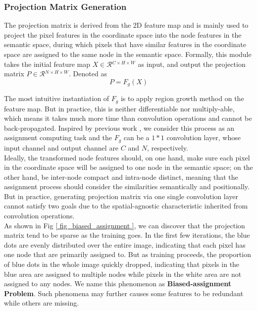 ﻿\documentclass[journal]{IEEEtran}
\begin{document}
\subsubsection{Projection Matrix Generation}\label{sec_generate_proj_matrix}
   
    The projection matrix is derived from the 2D feature map and is mainly used to project the pixel features in the coordinate space into the node features in the semantic space, during which pixels that have similar features in the coordinate space are assigned to the same node in the semantic space. Formally, this module takes the initial feature map ${X}\in\mathcal{R}{^{C\times H\times W}}$ as input, and output the projection matrix ${P}\in\mathcal{R}{^{N\times H \times W}}$. Denoted as 
    \begin{equation}\label{eq_gen_proj}
    P = F_g(X)
    \end{equation}

   
    The most intuitive instantiation of $F_g$ is to apply region growth method on the feature map. But in practice, this is neither differentiable nor multiply-able, which means it takes much more time than convolution operations and cannot be back-propagated. Inspired by previous work \cite{chen2019glore}, we consider this process as an assignment computing task and the $F_g$ can be a $1*1$ convolution layer, whose input channel and output channel are $C$ and $N$, respectively. \\   

 
    Ideally, the transformed node features should, on one hand, make sure each pixel in the coordinate space will be assigned to one node in the semantic space; on the other hand, be inter-node compact and intra-node distinct, meaning that the assignment process should consider the similarities semantically and positionally. But in practice, generating projection matrix via one single convolution layer cannot satisfy two goals due to the spatial-agnostic characteristic inherited from convolution operations.\\   
    
 
    As shown in Fig \ref{ fig_biased_assignment }, we can discover that the projection matrix tend to be sparse as the training goes. In the first few iterations, the blue dots are evenly distributed over the entire image, indicating that each pixel has one node that are primarily assigned to. But as training proceeds, the proportion of blue dots in the whole image quickly dropped, indicating that pixels in the blue area are assigned to multiple nodes while pixels in the white area are not assigned to any nodes. We name this phenomenon as \textbf{Biased-assignment Problem}. Such phenomena may further causes some features to be redundant while others are missing. \\
    
\end{document}
